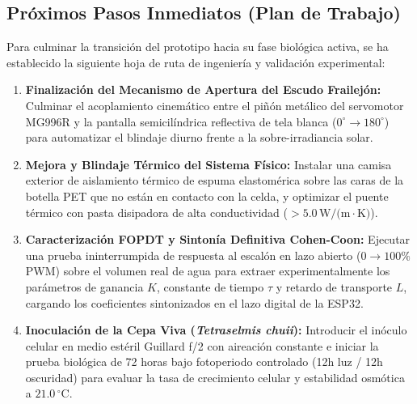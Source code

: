 \subsection{Próximos Pasos Inmediatos (Plan de Trabajo)}
Para culminar la transición del prototipo hacia su fase biológica activa, se ha establecido la siguiente hoja de ruta de ingeniería y validación experimental:

\begin{enumerate}[label=\textbf{Hito \arabic*:}, leftmargin=*, itemsep=2pt, topsep=3pt, parsep=1pt]
    \item \textbf{Finalización del Mecanismo de Apertura del Escudo Frailejón:}
    Culminar el acoplamiento cinemático entre el piñón metálico del servomotor MG996R y la pantalla semicilíndrica reflectiva de tela blanca ($0^\circ \to 180^\circ$) para automatizar el blindaje diurno frente a la sobre-irradiancia solar.
    
    \item \textbf{Mejora y Blindaje Térmico del Sistema Físico:}
    Instalar una camisa exterior de aislamiento térmico de espuma elastomérica sobre las caras de la botella PET que no están en contacto con la celda, y optimizar el puente térmico con pasta disipadora de alta conductividad ($>5.0\,\text{W/(m}\cdot\text{K)}$).
    
    \item \textbf{Caracterización FOPDT y Sintonía Definitiva Cohen-Coon:}
    Ejecutar una prueba ininterrumpida de respuesta al escalón en lazo abierto ($0 \to 100\%$ PWM) sobre el volumen real de agua para extraer experimentalmente los parámetros de ganancia $K$, constante de tiempo $\tau$ y retardo de transporte $L$, cargando los coeficientes sintonizados en el lazo digital de la ESP32.
    
    \item \textbf{Inoculación de la Cepa Viva (\textit{Tetraselmis chuii}):}
    Introducir el inóculo celular en medio estéril Guillard f/2 con aireación constante e iniciar la prueba biológica de 72 horas bajo fotoperiodo controlado (12h luz / 12h oscuridad) para evaluar la tasa de crecimiento celular y estabilidad osmótica a $21.0\,^\circ\text{C}$.
\end{enumerate}
